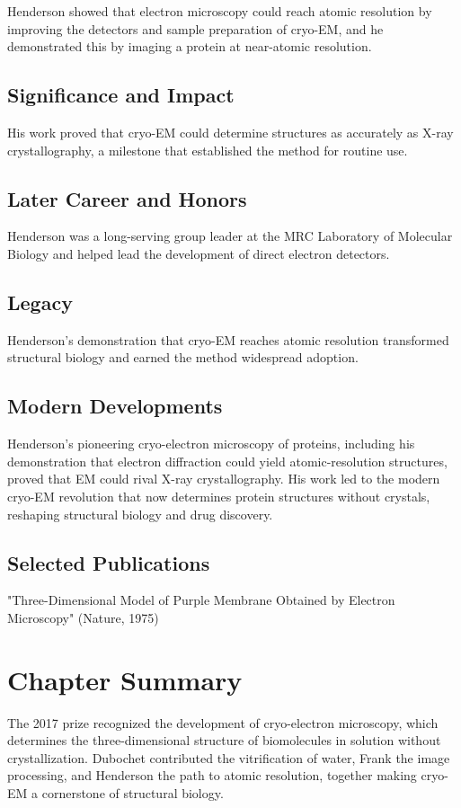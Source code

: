 Henderson showed that electron microscopy could reach atomic resolution by improving the detectors and sample preparation of cryo-EM, and he demonstrated this by imaging a protein at near-atomic resolution.

\subsection*{Significance and Impact}

His work proved that cryo-EM could determine structures as accurately as X-ray crystallography, a milestone that established the method for routine use.

\subsection*{Later Career and Honors}

Henderson was a long-serving group leader at the MRC Laboratory of Molecular Biology and helped lead the development of direct electron detectors.

\subsection*{Legacy}

Henderson's demonstration that cryo-EM reaches atomic resolution transformed structural biology and earned the method widespread adoption.

\subsection*{Modern Developments}

Henderson's pioneering cryo-electron microscopy of proteins, including his demonstration that electron diffraction could yield atomic-resolution structures, proved that EM could rival X-ray crystallography. His work led to the modern cryo-EM revolution that now determines protein structures without crystals, reshaping structural biology and drug discovery.

\subsection*{Selected Publications}

"Three-Dimensional Model of Purple Membrane Obtained by Electron Microscopy" (Nature, 1975)

\clearpage

\section*{Chapter Summary}

The 2017 prize recognized the development of cryo-electron microscopy, which determines the three-dimensional structure of biomolecules in solution without crystallization. Dubochet contributed the vitrification of water, Frank the image processing, and Henderson the path to atomic resolution, together making cryo-EM a cornerstone of structural biology.
